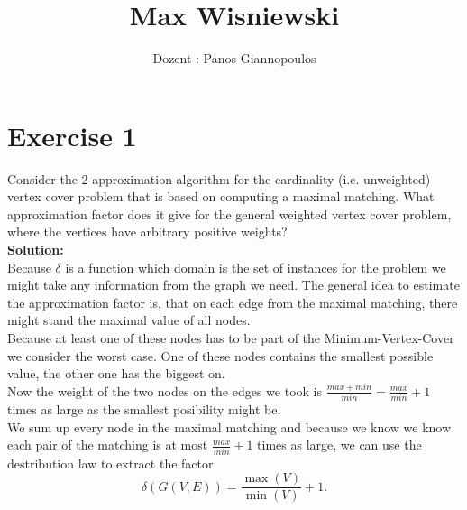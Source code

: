 \documentclass[11pt,a4paper,ngerman]{article}
\date{}
\title{Max Wisniewski}
\author{Dozent : Panos Giannopoulos}
\begin{document}

\renewcommand{\figurename}{Figure}

\maketitle
\thispagestyle{fancy}


\section*{Exercise 1}

Consider the 2-approximation algorithm for the cardinality (i.e. unweighted) vertex cover problem that is based on computing a maximal matching. What approximation factor does it give for the general weighted vertex cover problem, where the vertices have arbitrary positive weights?\\

\textbf{Solution:}\\
Because $\delta$ is a function which domain is the set of instances for the problem we might take any information from the graph we need. The general idea to estimate the approximation factor is, that on each edge from the maximal matching, there might stand the maximal value of all nodes.\\
Because at least one of these nodes has to be part of the Minimum-Vertex-Cover we consider the worst case. One of these nodes contains the smallest possible value, the other one has the biggest on.\\
Now the weight of the two nodes on the edges we took is $\frac{max+min}{min} = \frac{max}{min}+1$ times as large as the smallest posibility might be.\\
We sum up every node in the maximal matching and because we know we know each pair of the matching is at most $\frac{max}{min}+1$ times as large, we can use the destribution law to extract the factor 
$$
	\delta (G(V,E)) = \frac{\max (V)}{\min (V)} + 1.
$$
\end{document}
